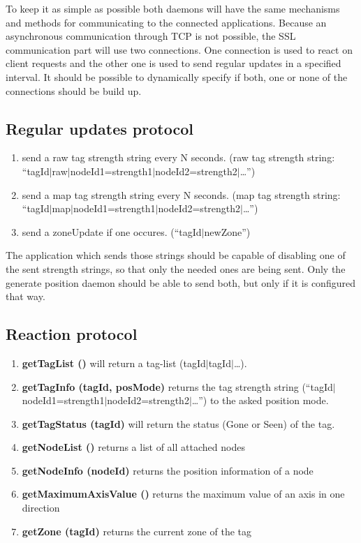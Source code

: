   To keep it as simple as possible both daemons will have the same mechanisms and methods for communicating to the connected applications. Because an asynchronous communication through TCP is not possible, the SSL communication part will use two connections. One connection is used to react on client requests and the other one is used to send regular updates in a specified interval. It should be possible to dynamically specify if both, one or none of the connections should be build up.

  \subsection*{Regular updates protocol}
   \begin{enumerate}
    \item send a raw tag strength string every N seconds. (raw tag strength string: ``tagId$|$raw$|$nodeId1=strength1$|$nodeId2=strength2$|$\dots'')
    \item send a map tag strength string every N seconds. (map tag strength string: ``tagId$|$map$|$nodeId1=strength1$|$nodeId2=strength2$|$\dots'')
    \item send a zoneUpdate if one occures. (``tagId$|$newZone'')
   \end{enumerate}

   The application which sends those strings should be capable of disabling one of the sent strength strings, so that only the needed ones are being sent. Only the generate position daemon should be able to send both, but only if it is configured that way.

  \subsection*{Reaction protocol}
   \begin{enumerate}
   \item \textbf{getTagList ()} will return a tag-list (tagId$|$tagId$|$\dots).
   \item \textbf{getTagInfo (tagId, posMode)} returns the tag strength string (``tagId$|$ nodeId1=strength1$|$nodeId2=strength2$|$\dots'') to the asked position mode.
   \item \textbf{getTagStatus (tagId)} will return the status (Gone or Seen) of the tag.
   \item \textbf{getNodeList ()} returns a list of all attached nodes
   \item \textbf{getNodeInfo (nodeId)} returns the position information of a node
   \item \textbf{getMaximumAxisValue ()} returns the maximum value of an axis in one direction
   \item \textbf{getZone (tagId)} returns the current zone of the tag
   \end{enumerate}

